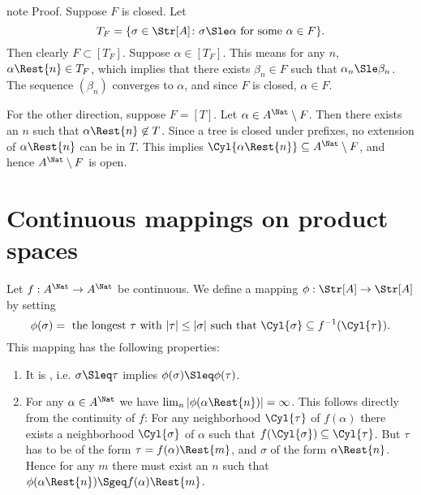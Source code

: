 \documentclass[letterpaper,10pt,english]{jupyterBook}
\begin{document}
\begin{sphinxadmonition}{note}
\sphinxAtStartPar
Proof. Suppose \(F\) is closed. Let
\begin{equation*}
	T_F = \{\sigma \in \Str[A] \colon \sigma \Sle \alpha \text{ for some }\alpha \in F\}.
\end{equation*}
\sphinxAtStartPar
Then clearly \(F \subset [T_F]\). Suppose \(\alpha \in [T_F]\). This means for any \(n\), \(\alpha\Rest{n} \in T_F\), which implies that there exists \(\beta_n \in F\) such that \(\alpha_n \Sle \beta_n\). The sequence \((\beta_n)\) converges to \(\alpha\), and since \(F\) is closed, \(\alpha \in F\).

\sphinxAtStartPar
For the other direction, suppose \(F = [T]\). Let \(\alpha \in A^\Nat \setminus F\). Then there exists an \(n\) such that \(\alpha\Rest{n} \not\in T\). Since a tree is closed under prefixes, no extension of \(\alpha\Rest{n}\) can be in \(T\). This implies \(\Cyl{\alpha\Rest{n}} \subseteq A^\Nat \setminus F\), and hence \(A^\Nat \setminus F\) is open.
\end{sphinxadmonition}


\section{Continuous mappings on product spaces}
\label{\detokenize{trees:continuous-mappings-on-product-spaces}}
\sphinxAtStartPar
Let \(f: A^\Nat \to A^\Nat\) be continuous. We define a mapping \(\phi: \Str[A] \to \Str[A]\) by setting
\begin{equation*}
	\phi(\sigma) = \text{ the longest $\tau$ with $|\tau| \leq |\sigma|$ such that } \Cyl{\sigma} \subseteq f^{-1}(\Cyl{\tau}).
\end{equation*}
\sphinxAtStartPar
This mapping has the following properties:
\begin{enumerate}
%
\item {} 
\sphinxAtStartPar
It is , i.e. \(\sigma \Sleq \tau\) implies \(\phi(\sigma) \Sleq \phi(\tau)\).

\item {} 
\sphinxAtStartPar
For any \(\alpha \in A^\Nat\) we have \(\lim_n |\phi(\alpha\Rest{n})| = \infty\).
This follows directly from the continuity of \(f\): For any neighborhood \(\Cyl{\tau}\) of \(f(\alpha)\) there exists a neighborhood \(\Cyl{\sigma}\) of \(\alpha\) such that \(f(\Cyl{\sigma}) \subseteq \Cyl{\tau}\). But \(\tau\) has to be of the form \(\tau = f(\alpha)\Rest{m}\), and \(\sigma\) of the form \(\alpha\Rest{n}\). Hence for any \(m\) there must exist an \(n\) such that \(\phi(\alpha\Rest{n}) \Sgeq f(\alpha)\Rest{m}\).

\end{enumerate}
\end{document}
